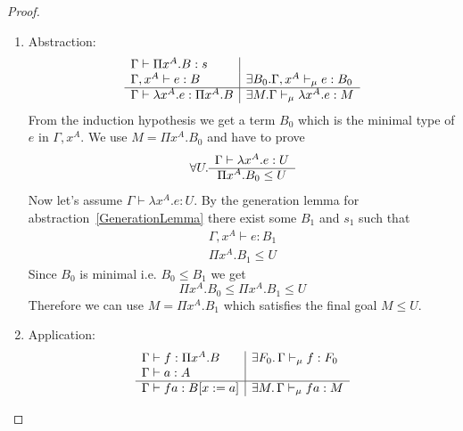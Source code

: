 \begin{theorem}
\begin{proof}
\begin{enumerate}
\begin{enumerate}
                \item Abstraction:
                    $$
                    \begin{array}{l|l}
                        \Gamma \vdash \Pi x^A. B : s
                        \\
                        \Gamma, x^A \vdash e: B
                        &
                        \exists B_0. \Gamma, x^A \vdash_\mu e: B_0
                        \\
                        \hline
                        \Gamma \vdash \lambda x^A. e: \Pi x^A. B
                        &
                        \exists M. \Gamma \vdash_\mu \lambda x^A.e: M
                    \end{array}
                    $$
                    From the induction hypothesis we get a term $B_0$ which is
                    the minimal type of $e$ in $\Gamma,x^A$. We use $M = \Pi
                    x^A. B_0$ and have to prove
                    $$
                    \forall U.
                    \begin{array}{c} \Gamma \vdash \lambda x^A. e: U \\ \hline \Pi x^A.B_0 \le U\end{array}
                    $$
                    Now let's assume $\Gamma \vdash \lambda x^A.e : U$. By the
                    generation lemma for abstraction~\ref{GenerationLemma} there
                    exist some $B_1$ and $s_1$ such that
                    $$
                    \begin{array}{l}
                        \Gamma, x^A \vdash e: B_1
                        \\
                        \Pi x^A. B_1 \le U
                    \end{array}
                    $$
                    Since $B_0$ is minimal i.e. $B_0 \le B_1$ we get
                    $$
                    \Pi x^A. B_0 \le \Pi x^A. B_1 \le U
                    $$
                    Therefore we can use $M = \Pi x^A. B_1$ which satisfies the
                    final goal $M \le U$.

                \item Application:
                    $$
                    \begin{array}{l|l}
                        \Gamma \vdash f: \Pi x^A.B
                        & \exists F_0.\, \Gamma \vdash_\mu f: F_0
                        \\
                        \Gamma \vdash a: A
                        \\
                        \hline
                        \Gamma \vdash f a: B[x:=a]
                        &
                        \exists M.\, \Gamma \vdash_\mu f a: M
                    \end{array}
                    $$


\end{enumerate}
\end{enumerate}
\end{proof}
\end{theorem}
